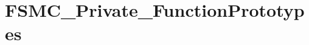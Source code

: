 \hypertarget{group___f_s_m_c___private___function_prototypes}{\section{F\-S\-M\-C\-\_\-\-Private\-\_\-\-Function\-Prototypes}
\label{group___f_s_m_c___private___function_prototypes}
}
